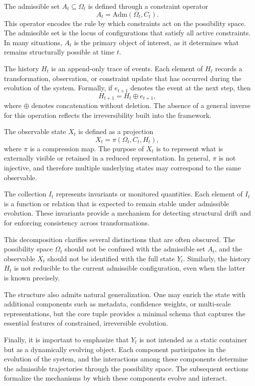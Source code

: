 \documentclass[11pt,oneside]{article}
\begin{document}
The admissible set \( A_t \subseteq \Omega_t \) is defined through a constraint operator
\[
A_t = \mathrm{Adm}(\Omega_t, C_t).
\]
This operator encodes the rule by which constraints act on the possibility space. The admissible set is the locus of configurations that satisfy all active constraints. In many situations, \( A_t \) is the primary object of interest, as it determines what remains structurally possible at time \( t \).

The history \( H_t \) is an append-only trace of events. Each element of \( H_t \) records a transformation, observation, or constraint update that has occurred during the evolution of the system. Formally, if \( e_{t+1} \) denotes the event at the next step, then
\[
H_{t+1} = H_t \oplus e_{t+1},
\]
where \( \oplus \) denotes concatenation without deletion. The absence of a general inverse for this operation reflects the irreversibility built into the framework.

The observable state \( X_t \) is defined as a projection
\[
X_t = \pi(\Omega_t, C_t, H_t),
\]
where \( \pi \) is a compression map. The purpose of \( X_t \) is to represent what is externally visible or retained in a reduced representation. In general, \( \pi \) is not injective, and therefore multiple underlying states may correspond to the same observable.

The collection \( I_t \) represents invariants or monitored quantities. Each element of \( I_t \) is a function or relation that is expected to remain stable under admissible evolution. These invariants provide a mechanism for detecting structural drift and for enforcing consistency across transformations.

This decomposition clarifies several distinctions that are often obscured. The possibility space \( \Omega_t \) should not be confused with the admissible set \( A_t \), and the observable \( X_t \) should not be identified with the full state \( Y_t \). Similarly, the history \( H_t \) is not reducible to the current admissible configuration, even when the latter is known precisely.

The structure also admits natural generalization. One may enrich the state with additional components such as metadata, confidence weights, or multi-scale representations, but the core tuple provides a minimal schema that captures the essential features of constrained, irreversible evolution.

Finally, it is important to emphasize that \( Y_t \) is not intended as a static container but as a dynamically evolving object. Each component participates in the evolution of the system, and the interactions among these components determine the admissible trajectories through the possibility space. The subsequent sections formalize the mechanisms by which these components evolve and interact.
\end{document}
